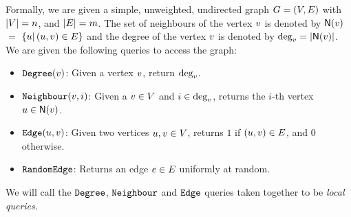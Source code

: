 
Formally, we are given a simple, unweighted, undirected graph $G = \left({V,E}\right)$ with $\left|{V}\right| = n$, and $\left|{E}\right| = m$. The set of neighbours of the vertex $v$ is denoted by ${\sf N}{\left({v}\right)}$ $=$  $\left\{{u|\left({u,v}\right)\in E}\right\}$ and the degree of the vertex $v$ is denoted by $\mbox{deg}_{v}= \left|{{\sf N}{\left({v}\right)}}\right|$. We are given the following queries to access the graph:
\begin{itemize}
    \item{$\texttt{Degree}{(v)}$: } Given a vertex $v$, return $\mbox{deg}_{v}$. 
    \item{$\texttt{Neighbour}(v,i)$: } Given a $v \in V$ and $i \in \mbox{deg}_{v}$, returns the $i$-th vertex $u \in {\sf N}(v)$.
    \item{$\texttt{Edge}(u,v)$: } Given two vertices $u,v \in V$, returns $1$ if $(u,v) \in E$, and $0$ otherwise.
    \item{$\texttt{RandomEdge}$:} Returns an edge $e \in E$ uniformly at random.
\end{itemize}
We will call the $\texttt{Degree}$, $\texttt{Neighbour}$ and $\texttt{Edge}$ queries taken together to be \emph{local queries}. 


